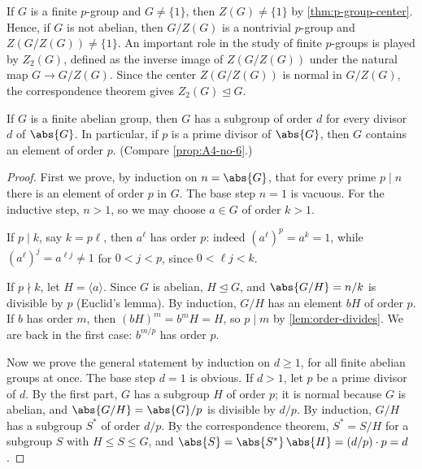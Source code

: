 \begin{eg}
	If \(G\) is a finite \(p\)-group and \(G \neq \{1\}\), then \(Z(G) \neq \{1\}\) by
	\autoref{thm:p-group-center}. Hence, if \(G\) is not abelian, then \(G/Z(G)\) is a
	nontrivial \(p\)-group and \(Z(G/Z(G)) \neq \{1\}\). An important role in the study of
	finite \(p\)-groups is played by \(Z_2(G)\), defined as the inverse image of
	\(Z(G/Z(G))\) under the natural map \(G \to G/Z(G)\). Since the center
	\(Z(G/Z(G))\) is normal in \(G/Z(G)\), the correspondence theorem gives
	\(Z_2(G) \trianglelefteq G\).
\end{eg}

\begin{proposition}\label{prop:abelian-subgroups}
	If \(G\) is a finite abelian group, then \(G\) has a subgroup of order \(d\) for every
	divisor \(d\) of \(\abs{G}\). In particular, if \(p\) is a prime divisor of \(\abs{G}\),
	then \(G\) contains an element of order \(p\). (Compare \autoref{prop:A4-no-6}.)
\end{proposition}

\begin{proof}
	First we prove, by induction on \(n = \abs{G}\), that for every prime \(p \mid n\) there
	is an element of order \(p\) in \(G\). The base step \(n = 1\) is vacuous. For the
	inductive step, \(n > 1\), so we may choose \(a \in G\) of order \(k > 1\).

	If \(p \mid k\), say \(k = p\ell\), then \(a^\ell\) has order \(p\): indeed
	\((a^\ell)^p = a^k = 1\), while \((a^\ell)^j = a^{\ell j} \neq 1\) for \(0 < j < p\),
	since \(0 < \ell j < k\).

	If \(p \nmid k\), let \(H = \langle a\rangle\). Since \(G\) is abelian,
	\(H \trianglelefteq G\), and \(\abs{G/H} = n/k\) is divisible by \(p\) (Euclid's lemma).
	By induction, \(G/H\) has an element \(bH\) of order \(p\). If \(b\) has order \(m\),
	then \((bH)^m = b^mH = H\), so \(p \mid m\) by \autoref{lem:order-divides}. We are back
	in the first case: \(b^{m/p}\) has order \(p\).

	Now we prove the general statement by induction on \(d \geq 1\), for all finite abelian
	groups at once. The base step \(d = 1\) is obvious. If \(d > 1\), let \(p\) be a prime
	divisor of \(d\). By the first part, \(G\) has a subgroup \(H\) of order \(p\); it is
	normal because \(G\) is abelian, and \(\abs{G/H} = \abs{G}/p\) is divisible by \(d/p\).
	By induction, \(G/H\) has a subgroup \(S^*\) of order \(d/p\). By the correspondence
	theorem, \(S^* = S/H\) for a subgroup \(S\) with \(H \leq S \leq G\), and
	\(\abs{S} = \abs{S^*}\,\abs{H} = (d/p) \cdot p = d\).
\end{proof}

